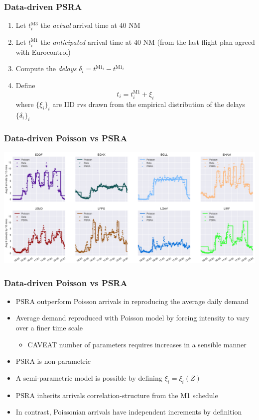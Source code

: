 \documentclass[table,aspectratio=169]{beamer}
\begin{document}
\begin{frame}[t]\frametitle{Data-driven PSRA}
    \begin{enumerate}
        \item Let $t^{\mathrm{M3}}_i$ the \alert{\emph{actual} arrival} time at 40 NM
        \item Let $t^{\mathrm{M1}}_i$ the \alert{\emph{anticipated} arrival} time at 40 NM (from the last flight plan agreed with Eurocontrol)
        \item Compute the \emph{delays} $\delta_i = t^{\mathrm{M1}_i} - t^{\mathrm{M1}_i}$
        \item Define
        \[t_i = t^{\mathrm{M1}}_i + \xi_i\]
        where $\{\xi_i\}_i$ are IID rvs drawn from the empirical distribution of the delays $\{\delta_i\}_i$
    \end{enumerate}
\end{frame}

\begin{frame}[t]\frametitle{Data-driven Poisson vs PSRA}
    \centering
    \includegraphics[width=.9\textwidth]{mean_simul_arrivals}
\end{frame}

\begin{frame}[t]\frametitle{Data-driven Poisson vs PSRA}
    \begin{itemize}
        \item PSRA outperform Poisson arrivals in reproducing the average daily demand
        \item Average demand reproduced with Poisson model by \alert{forcing} intensity to vary over a finer time scale
        \begin{itemize}
            \item \alert{CAVEAT} number of parameters requires increases in a sensible manner
        \end{itemize}
        \item PSRA is non-parametric
        \item A semi-parametric model is possible by defining $\xi_i = \xi_i(Z)$
        \item PSRA inherits \alert{arrivals correlation-structure} from the M1 schedule
        \item In contrast, Poissonian arrivals have \alert{independent increments} by definition
    \end{itemize}
\end{frame}
\end{document}
